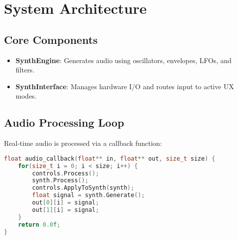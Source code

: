 \section{System Architecture}

\subsection{Core Components}
\begin{itemize}
    \item \textbf{SynthEngine}: Generates audio using oscillators, envelopes, LFOs, and filters.
    \item \textbf{SynthInterface}: Manages hardware I/O and routes input to active UX modes.
\end{itemize}

\subsection{Audio Processing Loop}
Real-time audio is processed via a callback function:

\begin{lstlisting}[language=C++, caption={Audio callback structure}]
float audio_callback(float** in, float** out, size_t size) {
    for(size_t i = 0; i < size; i++) {
        controls.Process();
        synth.Process();
        controls.ApplyToSynth(synth);
        float signal = synth.Generate();
        out[0][i] = signal;
        out[1][i] = signal;
    }
    return 0.0f;
}
\end{lstlisting}

